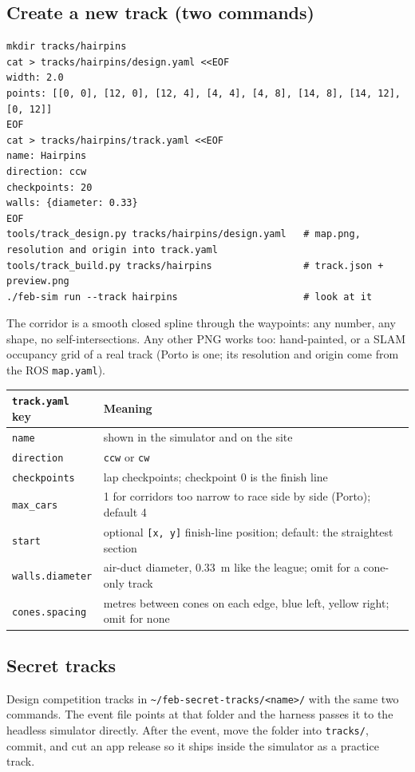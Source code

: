 \documentclass[11pt,a4paper]{article}
\newcommand{\file}[1]{\texttt{#1}}
\begin{document}
\subsection{Create a new track (two commands)}

\begin{lstlisting}
mkdir tracks/hairpins
cat > tracks/hairpins/design.yaml <<EOF
width: 2.0
points: [[0, 0], [12, 0], [12, 4], [4, 4], [4, 8], [14, 8], [14, 12], [0, 12]]
EOF
cat > tracks/hairpins/track.yaml <<EOF
name: Hairpins
direction: ccw
checkpoints: 20
walls: {diameter: 0.33}
EOF
tools/track_design.py tracks/hairpins/design.yaml   # map.png, resolution and origin into track.yaml
tools/track_build.py tracks/hairpins                # track.json + preview.png
./feb-sim run --track hairpins                      # look at it
\end{lstlisting}

The corridor is a smooth closed spline through the waypoints: any number, any shape, no
self-intersections. Any other PNG works too: hand-painted, or a SLAM occupancy grid of a real
track (Porto is one; its resolution and origin come from the ROS \file{map.yaml}).

\begin{tabularx}{\linewidth}{lX}
\toprule
\file{track.yaml} key & Meaning\\
\midrule
\texttt{name} & shown in the simulator and on the site\\
\texttt{direction} & \texttt{ccw} or \texttt{cw}\\
\texttt{checkpoints} & lap checkpoints; checkpoint 0 is the finish line\\
\texttt{max\_cars} & 1 for corridors too narrow to race side by side (Porto); default 4\\
\texttt{start} & optional \texttt{[x, y]} finish-line position; default: the straightest section\\
\texttt{walls.diameter} & air-duct diameter, 0.33~m like the league; omit for a cone-only track\\
\texttt{cones.spacing} & metres between cones on each edge, blue left, yellow right; omit for none\\
\bottomrule
\end{tabularx}

\subsection{Secret tracks}

Design competition tracks in \file{\textasciitilde/feb-secret-tracks/<name>/} with the same two
commands. The event file points at that folder and the harness passes it to the headless
simulator directly. After the event, move the folder into \file{tracks/}, commit, and cut an
app release so it ships inside the simulator as a practice track.
\end{document}
